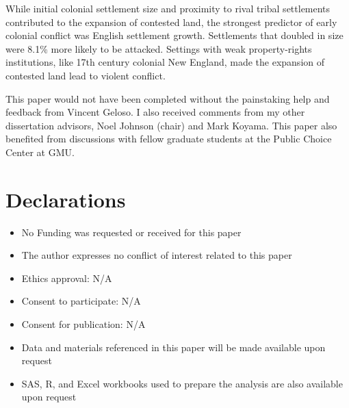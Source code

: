 \documentclass[sn-mathphys]{sn-jnl}%
\theoremstyle{thmstyleone}%
\theoremstyle{thmstyletwo}%
\theoremstyle{thmstylethree}%
\begin{document}
While initial colonial settlement size and proximity to rival tribal settlements contributed to the expansion of contested land, the strongest predictor of early colonial conflict was English settlement growth. Settlements that doubled in size were 8.1\% more likely to be attacked. Settings with weak property-rights institutions, like 17th century colonial New England, made the expansion of contested land lead to violent conflict.

\newpage
\backmatter






This paper would not have been completed without the painstaking help and feedback from Vincent Geloso. I also received comments from my other dissertation advisors, Noel Johnson (chair) and Mark Koyama. This paper also benefited from discussions with fellow graduate students at the Public Choice Center at GMU. 

\section*{Declarations}


\begin{itemize}
\item No Funding was requested or received for this paper
\item The author expresses no conflict of interest related to this paper
\item Ethics approval: N/A
\item Consent to participate: N/A
\item Consent for publication: N/A
\item Data and materials referenced in this paper will be made available upon request
\item SAS, R, and Excel workbooks used to prepare the analysis are also available upon request
\end{itemize}
\end{document}
